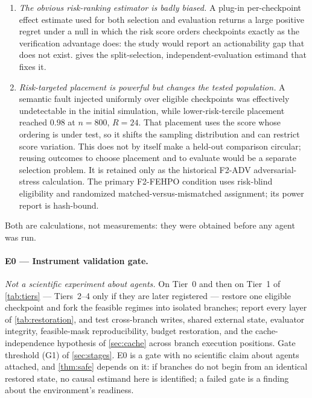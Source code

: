 \begin{enumerate}[label=(\arabic*),leftmargin=2.2em]
\item \emph{The obvious risk-ranking estimator is badly biased.}  A plug-in
  per-checkpoint effect estimate used for both selection and evaluation returns
  a large positive regret under a null in which the risk score orders checkpoints
  exactly as the verification advantage does: the study would report an
  actionability gap that does not exist.   gives the
  split-selection, independent-evaluation estimand that fixes it.
\item \emph{Risk-targeted placement is powerful but changes the tested
  population.}  A semantic fault injected uniformly over eligible checkpoints was
  effectively undetectable in the initial simulation, while lower-risk-tercile
  placement reached $0.98$ at $n=800$, $R=24$.  That placement uses the score
  whose ordering is under test, so it shifts the sampling distribution and can
  restrict score variation.  This does not by itself make a held-out comparison
  circular; reusing outcomes to choose placement and to evaluate would be a
  separate selection problem.  It is retained only as the historical
  F2-ADV adversarial-stress calculation.  The primary F2-FEHPO condition uses risk-blind eligibility and
  randomized matched-versus-mismatched assignment; its power report is
  hash-bound.
\end{enumerate}

Both are calculations, not measurements: they were obtained before any agent was
run.

\paragraph{E0 --- Instrument validation gate.}
\emph{Not a scientific experiment about agents.}  On Tier~0 and then on Tier~1
of \cref{tab:tiers} --- Tiers~2--4 only if they are later registered --- restore
one eligible checkpoint and fork the feasible regimes
into isolated branches; report every layer of \cref{tab:restoration}, and test
cross-branch writes, shared external state, evaluator integrity, feasible-mask
reproducibility, budget restoration, and the cache-independence hypothesis of
\cref{sec:cache} across branch execution positions.  Gate threshold (G1) of
\cref{sec:stages}.  E0 is a gate with no scientific claim about agents attached,
and \cref{thm:safe} depends on it: if branches do not begin from an identical
restored state, no causal estimand here is identified; a failed gate is a
finding about the environment's readiness.

